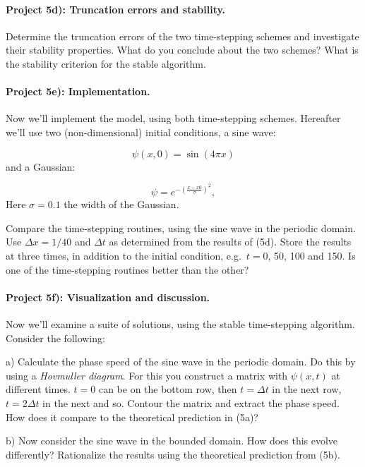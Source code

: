 \documentclass[%
oneside,                 %
final,                   %
10pt]{article}
\begin{document}
\paragraph{Project 5d): Truncation errors and stability.}
Determine the truncation errors of the two time-stepping schemes
and investigate their stability properties. What do you conclude
about the two schemes? What is the stability criterion for the
stable algorithm.


\paragraph{Project 5e): Implementation.}
Now we'll implement the model, using both time-stepping schemes.
Hereafter we'll use two (non-dimensional) initial
conditions, a sine wave:

\begin{equation}
\psi(x,0) = \sin\left( 4\pi x \right)
\end{equation}
and a Gaussian:

\begin{equation}
\psi = e^{-\left(\frac{x-x0}{\sigma}\right)^2},
\end{equation}
Here $\sigma = 0.1$ the width of the Gaussian.

Compare the time-stepping routines, using the sine wave in the
periodic domain. Use $\Delta x=1/40$ and $\Delta t$ as determined from the
results of (5d). Store the results at three times, in addition to the
initial condition, e.g.~$t=$0, 50, 100 and 150.  Is one of the
time-stepping routines better than the other?


\paragraph{Project 5f): Visualization and discussion.}
Now we'll examine a suite of solutions, using the stable time-stepping
algorithm. Consider the following:

a) Calculate the phase speed of the sine wave in the periodic domain.
Do this by using a \emph{Hovmuller diagram}.  For this you construct a
matrix with $\psi(x,t)$ at different times. $t=0$ can be on the bottom
row, then $t=\Delta t$ in the next row, $t=2\Delta t$ in the next and
so. Contour the matrix and extract the phase speed. How does it
compare to the theoretical prediction in (5a)?

b) Now consider the sine wave in the bounded domain. How does this
evolve differently? Rationalize the results using the theoretical
prediction from (5b).
\end{document}
